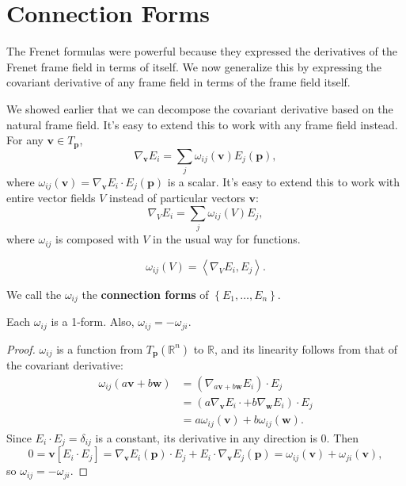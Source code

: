 \documentclass[10pt]{report}
\begin{document}

\section{Connection Forms}

The Frenet formulas were powerful because they expressed the derivatives of the Frenet frame field in terms of itself. We now generalize this by expressing the covariant derivative of any frame field in terms of the frame field itself.

We showed earlier that we can decompose the covariant derivative based on the natural frame field. It's easy to extend this to work with any frame field instead. For any $\mathbf{v} \in T_{\mathbf{p}}$,
\[
	\nabla_{\mathbf{v}}E_i = \sum_j \omega_{ij}(\mathbf{v}) E_j(\mathbf{p}),
\] where $\omega_{ij}(\mathbf{v}) = \nabla_{\mathbf{v}}E_i \cdot E_{j}(\mathbf{p})$ is a scalar. It's easy to extend this to work with entire vector fields $V$ instead of particular vectors $\mathbf{v}$:
\[
	\nabla_{V}E_i = \sum_j \omega_{ij}(V) E_j,
\] where $\omega_{ij}$ is composed with $V$ in the usual way for functions.

{\color{red}\[
		\omega_{ij}(V) = \left\langle \nabla_{V}E_i, E_j \right\rangle.
\] }

\begin{defn}[]
We call the $\omega_{ij}$ the \textbf{connection forms} of $\left\{ E_1, \dots, E_n \right\}$.
\end{defn}

\begin{lem}
	Each $\omega_{ij}$ is a 1-form. Also, $\omega_{ij}=-\omega_{ji}$.
\end{lem}
\begin{proof}
	$\omega_{ij}$ is a function from $T_{\mathbf{p}}(\mathbb{R}^n)$ to $\mathbb{R}$, and its linearity follows from that of the covariant derivative:
	\begin{align*}
		\omega_{ij}(a\mathbf{v} + b\mathbf{w}) &= (\nabla_{a\mathbf{v} + b\mathbf{w}}E_i) \cdot E_j \\
						       &= (a \nabla_{\mathbf{v}}E_i\cdot + b\nabla_{\mathbf{w}}E_i)\cdot E_j \\
						       &= a\omega_{ij}(\mathbf{v})+b\omega_{ij}(\mathbf{w}).
	\end{align*}
	Since $E_i \cdot E_j = \delta_{ij}$ is a constant, its derivative in any direction is 0. Then
	\[
		0 = \mathbf{v}[E_i \cdot E_j] = \nabla_{\mathbf{v}}E_i(\mathbf{p})\cdot E_j + E_i \cdot \nabla_{\mathbf{v}}E_j(\mathbf{p}) = \omega_{ij}(\mathbf{v}) + \omega_{ji}(\mathbf{v}),
	\]
	so $\omega_{ij}=-\omega_{ji}$.
\end{proof}
\end{document}
